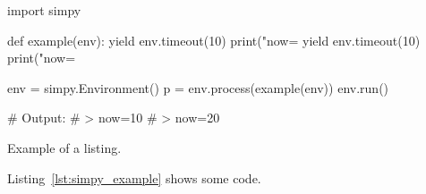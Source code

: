\documentclass[10pt]{article}
\begin{document}

\begin{listing}[H]
\begin{pythoncode}
import simpy

def example(env):
    yield env.timeout(10)
    print("now=%
    yield env.timeout(10)
    print("now=%

env = simpy.Environment()
p = env.process(example(env))
env.run()

# Output:
# > now=10
# > now=20
\end{pythoncode}
\caption{Example of a listing.}
\label{lst:simpy_example}
\end{listing}

Listing~\ref{lst:simpy_example} shows some code.
\end{document}
